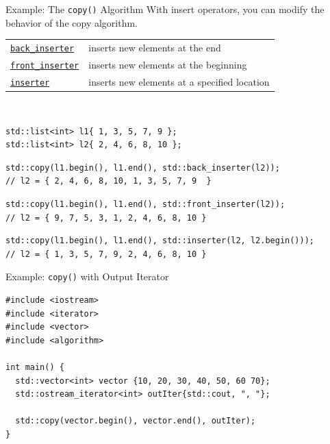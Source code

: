 \documentclass[14pt,aspectratio=1610]{beamer}
\begin{document}
\begin{frame}[fragile]{Example: The \texttt{copy()} Algorithm}
\small
With insert operators, you can modify the behavior of the copy algorithm.\\[0.5em]

\begin{tabular}{l l}
\href{https://en.cppreference.com/w/cpp/iterator/back_inserter}{\lstinline{back_inserter}} & inserts new elements at the end\\
\href{https://en.cppreference.com/w/cpp/iterator/front_inserter}{\lstinline{front_inserter}} & inserts new elements at the beginning\\
\href{https://en.cppreference.com/w/cpp/iterator/inserter}{\lstinline{inserter}} & inserts new elements at a specified location\\
\end{tabular}\\[1em]

\begin{lstlisting}[basicstyle=\small\ttfamily]
std::list<int> l1{ 1, 3, 5, 7, 9 };
std::list<int> l2{ 2, 4, 6, 8, 10 };
\end{lstlisting}

\begin{lstlisting}[basicstyle=\footnotesize\ttfamily]
std::copy(l1.begin(), l1.end(), std::back_inserter(l2));
// l2 = { 2, 4, 6, 8, 10, 1, 3, 5, 7, 9  }
\end{lstlisting}

\begin{lstlisting}[basicstyle=\footnotesize\ttfamily]
std::copy(l1.begin(), l1.end(), std::front_inserter(l2));
// l2 = { 9, 7, 5, 3, 1, 2, 4, 6, 8, 10 }
\end{lstlisting}

\begin{lstlisting}[basicstyle=\footnotesize\ttfamily]
std::copy(l1.begin(), l1.end(), std::inserter(l2, l2.begin()));
// l2 = { 1, 3, 5, 7, 9, 2, 4, 6, 8, 10 }
\end{lstlisting}
\end{frame}

\begin{frame}[fragile]{Example: \texttt{copy()} with Output Iterator}

\begin{lstlisting}[basicstyle=\small\ttfamily]
#include <iostream>
#include <iterator>
#include <vector>
#include <algorithm>

int main() {
  std::vector<int> vector {10, 20, 30, 40, 50, 60 70};
  std::ostream_iterator<int> outIter{std::cout, ", "};

  std::copy(vector.begin(), vector.end(), outIter);
}
\end{lstlisting}
\end{frame}
\end{document}
